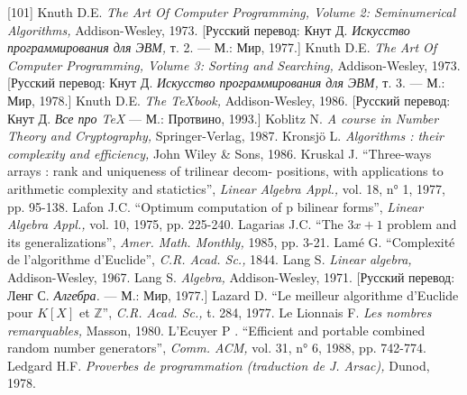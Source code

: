 \documentclass{../../template/mai_book}
\begin{document}
[101] Knuth D.E. {\itshape The Art Of Computer Programming, Volume 2: Seminumerical Algorithms,} Addison-Wesley, 1973. [Русский перевод: Кнут Д.
{\itshape Искусство программирования для ЭВМ,} т. 2. — М.: Мир, 1977.] \newline
[102] Knuth D.E. {\itshape The Art Of Computer Programming, Volume 3: Sorting and Searching,} Addison-Wesley, 1973. [Русский перевод: Кнут Д. {\itshape Искусство программирования для ЭВМ,} т. 3. — М.: Мир, 1978.] \newline
[103] Knuth D.E. {\itshape The \TeX book,} Addison-Wesley, 1986. [Русский перевод: Кнут Д. {\itshape Все про \TeX} — М.: Протвино, 1993.] \newline
[104] Koblitz N. {\itshape A course in Number Theory and Cryptography,} Springer-Verlag, 1987. \newline
[105] Kronsj\"o L. {\itshape Algorithms : their complexity and efficiency,} John Wiley \& Sons, 1986. \newline
[106] Kruskal J. “Three-ways arrays : rank and uniqueness of trilinear decom- \newline positions, with applications to arithmetic complexity and statictics”, {\itshape Linear Algebra Appl.,} vol. 18, n° 1, 1977, pp. 95-138. \newline
[107] Lafon J.C. “Optimum computation of p bilinear forms”, {\itshape Linear Algebra Appl.,} vol. 10, 1975, pp. 225-240. \newline
[108] Lagarias J.C. “The $3x + 1$ problem and its generalizations”, {\itshape Amer. Math. Monthly,} 1985, pp. 3-21.  \newline
[109] Lam\'{e} G. “Complexit\'{e} de l’algorithme d’Euclide”, {\itshape C.R. Acad. Sc.,} 1844.  \newline
[110] Lang S. {\itshape Linear algebra,} Addison-Wesley, 1967.  \newline
[111] Lang S. {\itshape Algebra,} Addison-Wesley, 1971. [Русский перевод: Ленг С. {\itshape Алгебра.} — М.: Мир, 1977.]  \newline
[112] Lazard D. “Le meilleur algorithme d’Euclide pour $K[X]$ et $\mathds{Z}$”, {\itshape C.R. Acad. Sc.,} t. 284, 1977. \newline
[113] Le Lionnais F. {\itshape Les nombres remarquables,} Masson, 1980. \newline
[114] L’Ecuyer P . “Efficient and portable combined random number generators”, {\itshape Comm. ACM,} vol. 31, n° 6, 1988, pp. 742-774. \newline
\newpage
\noindent
[115] Ledgard H.F. {\itshape Proverbes de programmation (traduction de J. Arsac),} Dunod, 1978. \newline
\end{document}
